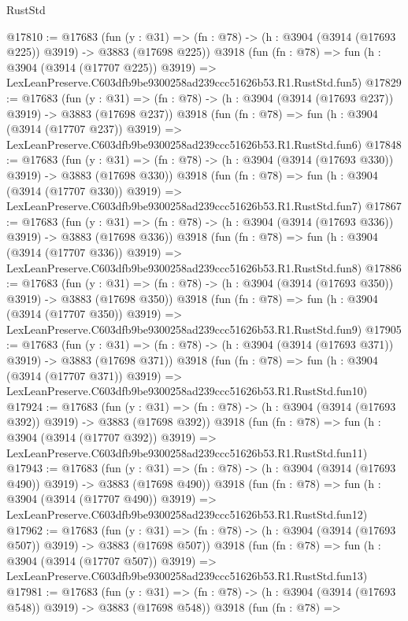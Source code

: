 \begin{lexlean}{RustStd}
\begin{coremodule}
@17810 := @17683
    (fun (y : @31) => (fn : @78) -> (h : @3904 (@3914 (@17693 @225)) @3919) -> @3883 (@17698 @225))
    @3918
    (fun (fn : @78) =>
    fun (h : @3904 (@3914 (@17707 @225)) @3919) =>
    LexLeanPreserve.C603dfb9be9300258ad239ccc51626b53.R1.RustStd.fun5)
@17829 := @17683
    (fun (y : @31) => (fn : @78) -> (h : @3904 (@3914 (@17693 @237)) @3919) -> @3883 (@17698 @237))
    @3918
    (fun (fn : @78) =>
    fun (h : @3904 (@3914 (@17707 @237)) @3919) =>
    LexLeanPreserve.C603dfb9be9300258ad239ccc51626b53.R1.RustStd.fun6)
@17848 := @17683
    (fun (y : @31) => (fn : @78) -> (h : @3904 (@3914 (@17693 @330)) @3919) -> @3883 (@17698 @330))
    @3918
    (fun (fn : @78) =>
    fun (h : @3904 (@3914 (@17707 @330)) @3919) =>
    LexLeanPreserve.C603dfb9be9300258ad239ccc51626b53.R1.RustStd.fun7)
@17867 := @17683
    (fun (y : @31) => (fn : @78) -> (h : @3904 (@3914 (@17693 @336)) @3919) -> @3883 (@17698 @336))
    @3918
    (fun (fn : @78) =>
    fun (h : @3904 (@3914 (@17707 @336)) @3919) =>
    LexLeanPreserve.C603dfb9be9300258ad239ccc51626b53.R1.RustStd.fun8)
@17886 := @17683
    (fun (y : @31) => (fn : @78) -> (h : @3904 (@3914 (@17693 @350)) @3919) -> @3883 (@17698 @350))
    @3918
    (fun (fn : @78) =>
    fun (h : @3904 (@3914 (@17707 @350)) @3919) =>
    LexLeanPreserve.C603dfb9be9300258ad239ccc51626b53.R1.RustStd.fun9)
@17905 := @17683
    (fun (y : @31) => (fn : @78) -> (h : @3904 (@3914 (@17693 @371)) @3919) -> @3883 (@17698 @371))
    @3918
    (fun (fn : @78) =>
    fun (h : @3904 (@3914 (@17707 @371)) @3919) =>
    LexLeanPreserve.C603dfb9be9300258ad239ccc51626b53.R1.RustStd.fun10)
@17924 := @17683
    (fun (y : @31) => (fn : @78) -> (h : @3904 (@3914 (@17693 @392)) @3919) -> @3883 (@17698 @392))
    @3918
    (fun (fn : @78) =>
    fun (h : @3904 (@3914 (@17707 @392)) @3919) =>
    LexLeanPreserve.C603dfb9be9300258ad239ccc51626b53.R1.RustStd.fun11)
@17943 := @17683
    (fun (y : @31) => (fn : @78) -> (h : @3904 (@3914 (@17693 @490)) @3919) -> @3883 (@17698 @490))
    @3918
    (fun (fn : @78) =>
    fun (h : @3904 (@3914 (@17707 @490)) @3919) =>
    LexLeanPreserve.C603dfb9be9300258ad239ccc51626b53.R1.RustStd.fun12)
@17962 := @17683
    (fun (y : @31) => (fn : @78) -> (h : @3904 (@3914 (@17693 @507)) @3919) -> @3883 (@17698 @507))
    @3918
    (fun (fn : @78) =>
    fun (h : @3904 (@3914 (@17707 @507)) @3919) =>
    LexLeanPreserve.C603dfb9be9300258ad239ccc51626b53.R1.RustStd.fun13)
@17981 := @17683
    (fun (y : @31) => (fn : @78) -> (h : @3904 (@3914 (@17693 @548)) @3919) -> @3883 (@17698 @548))
    @3918
    (fun (fn : @78) =>

\end{coremodule}
\end{lexlean}
